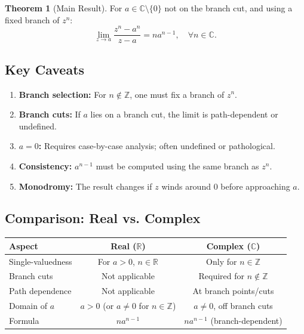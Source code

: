 \documentclass{article}
\theoremstyle{definition}
\newtheorem{theorem}{Theorem}[section]
\theoremstyle{remark}
\newcommand{\C}{\mathbb{C}}
\newcommand{\R}{\mathbb{R}}
\newcommand{\Z}{\mathbb{Z}}
\begin{document}
\begin{theorem}[Main Result]
For $a \in \C \setminus \{0\}$ not on the branch cut, and using a fixed branch of $z^n$:
\begin{equation}
\boxed{\lim_{z \to a} \frac{z^n - a^n}{z - a} = n a^{n-1}, \quad \forall n \in \C.}
\end{equation}
\end{theorem}

\subsection{Key Caveats}

\begin{enumerate}
    \item \textbf{Branch selection:} For $n \notin \Z$, one must fix a branch of $z^n$.
    \item \textbf{Branch cuts:} If $a$ lies on a branch cut, the limit is path-dependent or undefined.
    \item \textbf{$a = 0$:} Requires case-by-case analysis; often undefined or pathological.
    \item \textbf{Consistency:} $a^{n-1}$ must be computed using the same branch as $z^n$.
    \item \textbf{Monodromy:} The result changes if $z$ winds around $0$ before approaching $a$.
\end{enumerate}

\subsection{Comparison: Real vs. Complex}

\begin{center}
\renewcommand{\arraystretch}{1.4}
\begin{tabular}{|l|c|c|}
\hline
\textbf{Aspect} & \textbf{Real ($\R$)} & \textbf{Complex ($\C$)} \\
\hline
Single-valuedness & For $a > 0$, $n \in \R$ & Only for $n \in \Z$ \\
Branch cuts & Not applicable & Required for $n \notin \Z$ \\
Path dependence & Not applicable & At branch points/cuts \\
Domain of $a$ & $a > 0$ (or $a \neq 0$ for $n \in \Z$) & $a \neq 0$, off branch cuts \\
Formula & $n a^{n-1}$ & $n a^{n-1}$ (branch-dependent) \\
\hline
\end{tabular}
\end{center}
\end{document}
